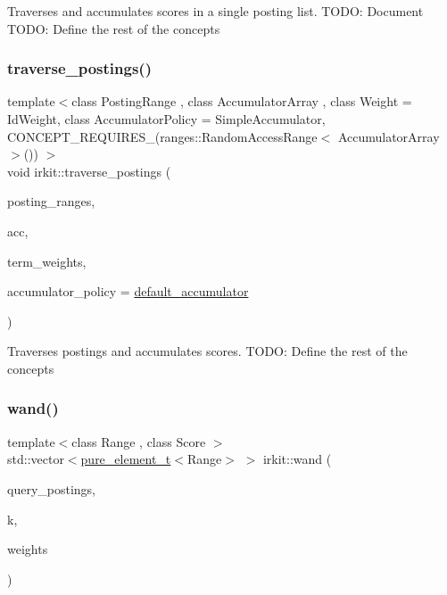 Traverses and accumulates scores in a single posting list. T\+O\+DO\+: Document T\+O\+DO\+: Define the rest of the concepts \mbox{\label{namespaceirkit_acf35c27b2c6a58878a6562f8bf6492a0}} 
\subsubsection{\texorpdfstring{traverse\+\_\+postings()}{traverse\_postings()}}
{\footnotesize\ttfamily template$<$class Posting\+Range , class Accumulator\+Array , class Weight  = Id\+Weight, class Accumulator\+Policy  = Simple\+Accumulator, C\+O\+N\+C\+E\+P\+T\+\_\+\+R\+E\+Q\+U\+I\+R\+E\+S\+\_\+(ranges\+::\+Random\+Access\+Range$<$ Accumulator\+Array $>$()) $>$ \\
void irkit\+::traverse\+\_\+postings (\begin{DoxyParamCaption}\item[{const std\+::vector$<$ Posting\+Range $>$ \&}]{posting\+\_\+ranges,  }\item[{Accumulator\+Array \&}]{acc,  }\item[{const std\+::vector$<$ \hyperlink{namespaceirkit_a754dabe3346f950c948e7596d9d46c71}{score\+\_\+t}$<$ \hyperlink{namespaceirkit_afcffab67300c5c703cb38a363c9a6f1d}{pure\+\_\+element\+\_\+t}$<$ Posting\+Range $>$$>$$>$ \&}]{term\+\_\+weights,  }\item[{Accumulator\+Policy \&}]{accumulator\+\_\+policy = {\ttfamily \hyperlink{namespaceirkit_a823671564bf545991e9708011e4a8df1}{default\+\_\+accumulator}} }\end{DoxyParamCaption})}

Traverses postings and accumulates scores. T\+O\+DO\+: Define the rest of the concepts \mbox{\label{namespaceirkit_aea02f4f5f20e40308d5f07ce72d79d60}} 
\subsubsection{\texorpdfstring{wand()}{wand()}}
{\footnotesize\ttfamily template$<$class Range , class Score $>$ \\
std\+::vector$<$\hyperlink{namespaceirkit_afcffab67300c5c703cb38a363c9a6f1d}{pure\+\_\+element\+\_\+t}$<$Range$>$ $>$ irkit\+::wand (\begin{DoxyParamCaption}\item[{const std\+::vector$<$ Range $>$ \&}]{query\+\_\+postings,  }\item[{std\+::size\+\_\+t}]{k,  }\item[{const std\+::vector$<$ Score $>$ \&}]{weights }\end{DoxyParamCaption})}



